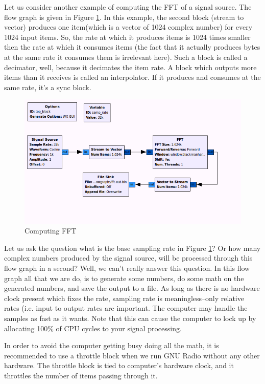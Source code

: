\documentclass[a4paper,10pt]{article}
\begin{document}
Let us consider another example of computing the FFT of a signal source.
The flow graph is given in Figure \ref{fig:compute-fft}.
In this example, the second block (stream to vector) produces one item(which is a vector of 1024 complex number) for every 1024 input items.
So, the rate at which it produces items is 1024 times smaller then the rate at which it consumes items 
(the fact that it actually produces bytes at the same rate it consumes them is irrelevant here).
Such a block is called a decimator, well, because it decimates the item rate. 
A block which outputs more items than it receives is called an interpolator. 
If it produces and consumes at the same rate, it's a sync block.
\begin{figure}
 \centering
 \includegraphics[scale=0.4]{figures/fft.png}
 \caption{Computing FFT \label{fig:compute-fft}}
\end{figure}

Let us ask the question what is the base sampling rate in Figure \ref{fig:compute-fft}?
Or how many complex numbers produced by the signal source, will be processed through this flow graph in a second?
Well, we can't really answer this question.
In this flow graph all that we are do, is to generate some numbers, do some math on the generated numbers, and save the output to a file.
As long as there is no hardware clock present which fixes the rate, 
sampling rate is meaningless--only relative rates (i.e. input to output rates are important. 
The computer may handle the samples as fast as it wants.
Note that this can cause the computer to lock up by allocating 100\% of CPU cycles to your signal processing.

In order to avoid the computer getting busy doing all the math, it is recommended to use a throttle block
when we run GNU Radio without any other hardware. The throttle block is tied to computer's hardware clock,
and it throttles the number of items passing through it.
\end{document}
